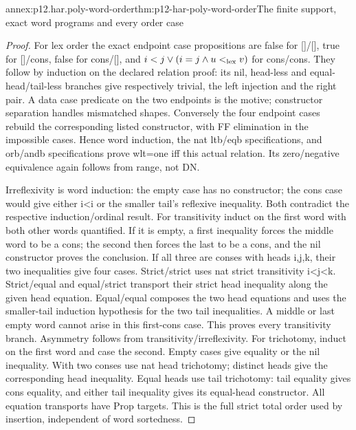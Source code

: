\begin{annexitem}{annex:p12.har.poly-word-order}{thm:p12-har-poly-word-order}{The finite support, exact word programs and every order case}
\begin{proof}
For lex order the exact endpoint case propositions are false for
[]/[], true for []/cons, false for cons/[], and
\(i<j\vee(i=j\wedge u<_{\rm lex}v)\) for cons/cons.
They follow by induction on the declared relation proof: its nil,
head-less and equal-head/tail-less branches give respectively trivial,
the left injection and the right pair. A data case predicate on the
two endpoints is the motive; constructor separation handles mismatched
shapes. Conversely the four endpoint cases rebuild the corresponding
listed constructor, with FF elimination in the impossible cases.
Hence word induction, the nat ltb/eqb specifications, and orb/andb
specifications prove wlt=one iff this actual relation. Its zero/negative
equivalence again follows from range, not DN.

Irreflexivity is word induction: the empty case has no constructor;
the cons case would give either i<i or the smaller tail's reflexive
inequality. Both contradict the respective induction/ordinal result.
For transitivity induct on the first word with both other words
quantified. If it is empty, a first inequality forces the middle word
to be a cons; the second then forces the last to be a cons, and the
nil constructor proves the conclusion. If all three are conses with
heads i,j,k, their two inequalities give four cases. Strict/strict
uses nat strict transitivity i<j<k. Strict/equal and equal/strict
transport their strict head inequality along the given head equation.
Equal/equal composes the two head equations and uses the smaller-tail
induction hypothesis for the two tail inequalities. A middle or last
empty word cannot arise in this first-cons case. This proves every
transitivity branch. Asymmetry follows from transitivity/irreflexivity.
For trichotomy, induct on the first word and case the second. Empty
cases give equality or the nil inequality. With two conses use nat
head trichotomy; distinct heads give the corresponding head inequality.
Equal heads use tail trichotomy: tail equality gives cons equality,
and either tail inequality gives its equal-head constructor. All
equation transports have Prop targets. This is the full strict total
order used by insertion, independent of word sortedness.
\end{proof}
\end{annexitem}

